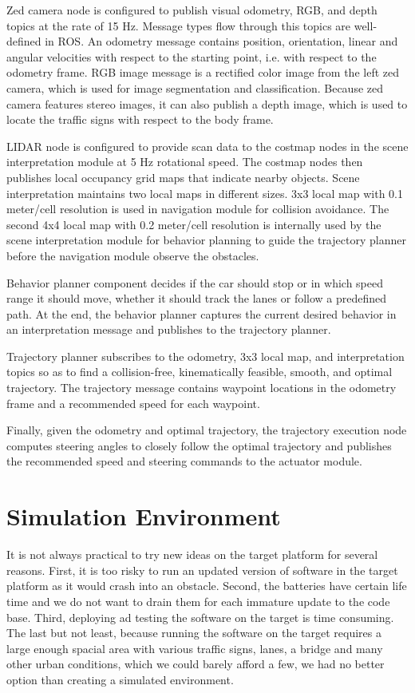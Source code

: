 Zed camera node is configured to publish visual odometry, RGB, and depth topics
at the rate of 15 Hz. Message types flow through this topics are well-defined
in ROS. An odometry message contains position, orientation, linear and angular
velocities with respect to the starting point, i.e. with respect to the
odometry frame. RGB image message is a rectified color image from the left zed
camera, which is used for image segmentation and classification. Because zed
camera features stereo images, it can also publish a depth image, which is used
to locate the traffic signs with respect to the body frame.

LIDAR node is configured to provide scan data to the costmap nodes in the scene
interpretation module at 5 Hz rotational speed. The costmap nodes then
publishes local occupancy grid maps that indicate nearby objects. Scene
interpretation maintains two local maps in different sizes. 3x3 local map with
0.1 meter/cell resolution is used in navigation module for collision avoidance.
The second 4x4 local map with 0.2 meter/cell resolution is internally used by
the scene interpretation module for behavior planning to guide the trajectory
planner before the navigation module observe the obstacles.

Behavior planner component decides if the car should stop or in which speed
range it should move, whether it should track the lanes or follow a predefined
path. At the end, the behavior planner captures the current desired
behavior in an interpretation message and publishes to the trajectory planner.

Trajectory planner subscribes to the odometry, 3x3 local map, and
interpretation topics so as to find a collision-free, kinematically feasible,
smooth, and optimal trajectory. The trajectory message contains waypoint
locations in the odometry frame and a recommended speed for each waypoint.

Finally, given the odometry and optimal trajectory, the trajectory execution
node computes steering angles to closely follow the optimal trajectory and
publishes the recommended speed and steering commands to the actuator module.

\section{Simulation Environment}

It is not always practical to try new ideas on the target platform for several
reasons. First, it is too risky to run an updated version of software in the
target platform as it would crash into an obstacle. Second, the batteries have
certain life time and we do not want to drain them for each immature update to
the code base. Third, deploying ad testing the software on the target is time
consuming. The last but not least, because running the software on the target
requires a large enough spacial area with various traffic signs, lanes, a
bridge and many other urban conditions, which we could barely afford a few, we
had no better option than creating a simulated environment.

